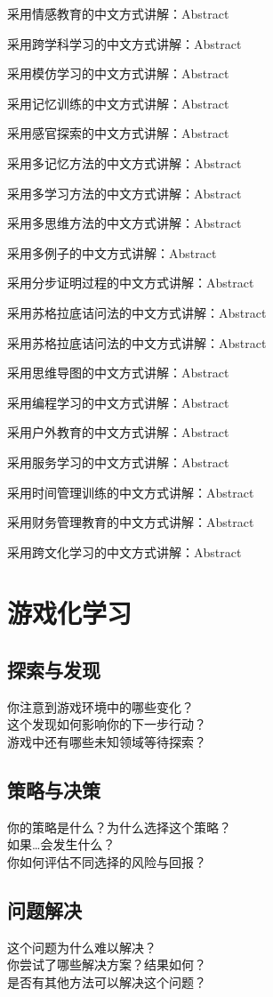 \documentclass[12pt]{book}
\begin{document}
采用情感教育的中文方式讲解：Abstract

采用跨学科学习的中文方式讲解：Abstract


采用模仿学习的中文方式讲解：Abstract


采用记忆训练的中文方式讲解：Abstract


采用感官探索的中文方式讲解：Abstract

采用多记忆方法的中文方式讲解：Abstract


采用多学习方法的中文方式讲解：Abstract

采用多思维方法的中文方式讲解：Abstract


采用多例子的中文方式讲解：Abstract


采用分步证明过程的中文方式讲解：Abstract


采用苏格拉底诘问法的中文方式讲解：Abstract


采用苏格拉底诘问法的中文方式讲解：Abstract


采用思维导图的中文方式讲解：Abstract


采用编程学习的中文方式讲解：Abstract


采用户外教育的中文方式讲解：Abstract


采用服务学习的中文方式讲解：Abstract


采用时间管理训练的中文方式讲解：Abstract


采用财务管理教育的中文方式讲解：Abstract


采用跨文化学习的中文方式讲解：Abstract

\section{游戏化学习}
\subsection{探索与发现}
你注意到游戏环境中的哪些变化？\\
这个发现如何影响你的下一步行动？\\
游戏中还有哪些未知领域等待探索？\\

\subsection{策略与决策}
你的策略是什么？为什么选择这个策略？\\
如果…会发生什么？\\
你如何评估不同选择的风险与回报？\\

\subsection{问题解决}
这个问题为什么难以解决？\\
你尝试了哪些解决方案？结果如何？\\
是否有其他方法可以解决这个问题？\\
\end{document}
